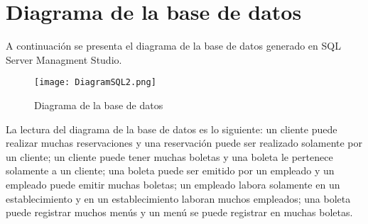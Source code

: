 	\chapter{Diagrama de la base de datos}\label{Chap: Diagrama de la base de datos}
	A continuación se presenta el diagrama de la base de datos generado en SQL Server Managment Studio.
		\begin{figure}[h!]
			\centering
			\texttt{[image: DiagramSQL2.png]}
			\caption{Diagrama de la base de datos}
			\label{fig: Diagrama de la base de datos}
		\end{figure}
	
	La lectura del diagrama de la base de datos es lo siguiente: un cliente puede realizar muchas reservaciones y una reservación puede ser realizado solamente por un cliente; un cliente puede tener muchas boletas y una boleta le pertenece solamente a un cliente; una boleta puede ser emitido por un empleado y un empleado puede emitir muchas boletas; un empleado labora solamente en un establecimiento y en un establecimiento laboran muchos empleados; una boleta puede registrar muchos menús y un menú se puede registrar en muchas boletas.	
		
	